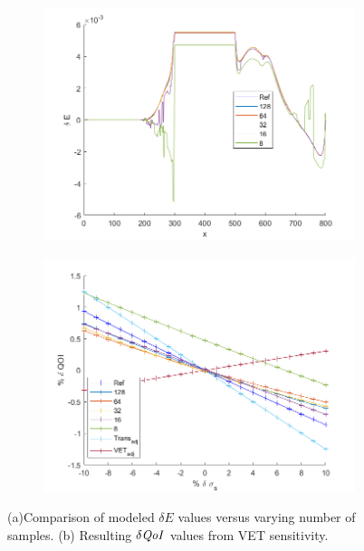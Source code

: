\documentclass{article}
\newcommand{\qoi}{{\it QoI}\xspace}
\begin{document}
\begin{figure}[H]
\centering
  \begin{subfigure}{.5\textwidth}
  \includegraphics[width=0.98 \linewidth]{E8_nsamples.png}
  \caption{}
  \label{fig:E8n}
  \end{subfigure}%
  \begin{subfigure}{.5\textwidth}
  \includegraphics[width=0.98 \linewidth]{E8_dqoi.png}
  \caption{}
  \label{fig:E8dqoi}
  \end{subfigure}%
  \caption{(a)Comparison of modeled $\delta E$ values versus varying number of samples. (b) Resulting $\delta \qoi$ values from VET sensitivity.}
\end{figure} 
\end{document}
